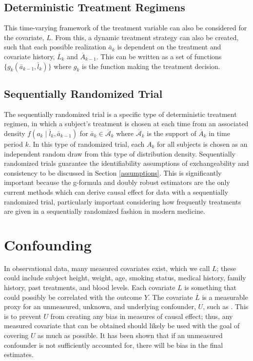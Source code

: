 \subsection{Deterministic Treatment Regimens} 
This time-varying framework of the treatment variable can also be considered for the covariate, $L$.  From this, a dynamic treatment strategy can also be created, such that each possible realization $\bar{a}_{k}$ is dependent on the treatment and covariate history, $\overline{L}_k$ and $\overline{A}_{k-1}$.  This can be written as a set of functions $\{g_k (\bar{a}_{k-1}, \bar{l}_k )\}$ where $g_k$ is the function making the treatment decision.  

\subsection{Sequentially Randomized Trial} 
The sequentially randomized trial is a specific type of deterministic treatment regimen, in which a subject's treatment is chosen at each time from an associated density $f (a_k \mid \bar{l}_k, \bar{a}_{k-1})$ for $\bar{a}_k \in \overline{\mathcal{A}}_k$ where $\overline{\mathcal{A}}_k$ is the support of $\overline{A}_k$ in time period $k$.\cite{young2011comparative}  In this type of randomized trial, each $A_k$ for all subjects is chosen as an independent random draw from this type of distribution density.  Sequentially randomized trials guarantee the identifiability assumptions of exchangeability and consistency to be discussed in Section \ref{assumptions}.  This is significantly important because the g-formula and doubly robust estimators are the only current methods which can derive causal effect for data with a sequentially randomized trial, particularly important considering how frequently treatments are given in a sequentially randomized fashion in modern medicine.

\section{Confounding} 
In observational data, many measured covariates exist, which we call $L$; these could include subject height, weight, age, smoking status, medical history, family history, past treatments, and blood levels.  Each covariate $L$ is something that could possibly be correlated with the outcome $Y$. The covariate $\overline{L}$ is a measurable proxy for an unmeasured, unknown, and underlying confounder, $U$, such as .  This is to prevent $U$ from creating any bias in measures of causal effect; thus, any measured covariate that can be obtained should likely be used with the goal of covering $U$ as much as possible. It has been shown that if an unmeasured confounder is not sufficiently accounted for, there will be bias in the final estimates.\cite{vanderweele2011unmeasured}

